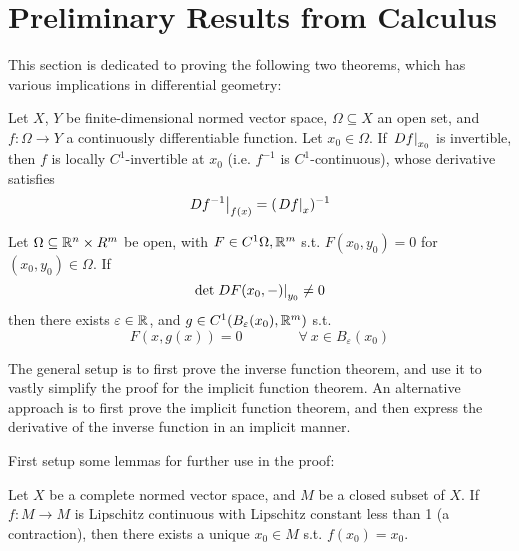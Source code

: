 \documentclass{article}
\begin{document}

\tableofcontents
\newpage

\def\open{\mathcal{O}}

\section{Preliminary Results from Calculus}

This section is dedicated to proving the following two theorems, which has various implications in differential geometry:

\begin{theorem}\label{thm:inverse function theorem}
    Let $X$, $Y$ be finite-dimensional normed vector space, $\Omega \subseteq X$ an open set, and $f: \Omega \to Y$ a continuously differentiable function. Let $x_0 \in \Omega$. If $\left.Df\right|_{x_0}$ is invertible, then $f$ is locally $C^{1}$-invertible at $x_0$ (i.e. $f^{-1}$ is $C^1$-continuous), whose derivative satisfies
    \[
        \left.Df^{-1}\right|_{f(x)} = (\left.Df\right|_{x})^{-1}
    \]
\end{theorem}
\vspace{1em}

\begin{theorem}\label{thm:implicit function theorem}
    Let $\Omega \subseteq \mathbb{R}^n \times R^m$ be open, with $F \in C^1{\Omega, \mathbb{R}^m}$ s.t. $F(x_0, y_0) = 0$ for $(x_0, y_0) \in \Omega$. If
    \[
        \det \left.DF(x_0, -)\right|_{y_0} \neq 0
    \]
    then there exists $\varepsilon \in \mathbb{R}$, and $g \in C^1(B_{\varepsilon}(x_0), \mathbb{R}^m)$ s.t.
    \[
        F(x, g(x)) = 0 \qquad \qquad \forall \ x \in B_{\varepsilon}(x_0)
    \]
\end{theorem}

The general setup is to first prove the inverse function theorem, and use it to vastly simplify the proof for the implicit function theorem. An alternative approach is to first prove the implicit function theorem, and then express the derivative of the inverse function in an implicit manner. 

First setup some lemmas for further use in the proof:

\begin{lemma}\label{lem: contraction mapping principle}
    Let $X$ be a complete normed vector space, and $M$ be a closed subset of $X$. If $f: M \to M$ is Lipschitz continuous with Lipschitz constant less than 1 (a contraction), then there exists a unique $x_0 \in M$ s.t. $f(x_0) = x_0$.
\end{lemma}
\end{document}
